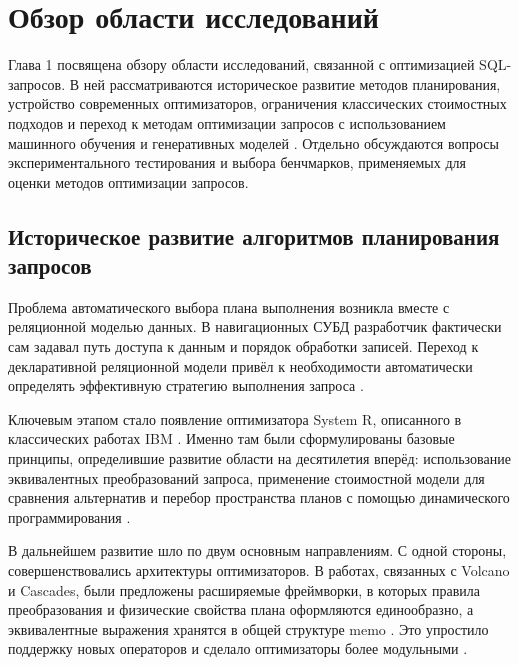 \chapter{Обзор области исследований}\label{ch:ch1}
Глава 1 посвящена обзору области исследований, связанной с оптимизацией SQL-запросов. В ней рассматриваются историческое развитие методов планирования, устройство современных оптимизаторов, ограничения классических стоимостных подходов и переход к методам оптимизации запросов с использованием машинного обучения и генеративных моделей \cite{10.1145/275487.275492, Lan_2021, ZOU2022100304, 10.1145/3626246.3654692}. Отдельно обсуждаются вопросы экспериментального тестирования и выбора бенчмарков, применяемых для оценки методов оптимизации запросов.

\section{Историческое развитие алгоритмов планирования запросов}

Проблема автоматического выбора плана выполнения возникла вместе с реляционной моделью данных. В навигационных СУБД разработчик фактически сам задавал путь доступа к данным и порядок обработки записей. Переход к декларативной реляционной модели привёл к необходимости автоматически определять эффективную стратегию выполнения запроса \cite{10.1145/362384.362685, 10.1145/356662.356666, 10.1145/800227.806919, 10.1145/960124.806919}.

Ключевым этапом стало появление оптимизатора System R, описанного в классических работах IBM \cite{10.1145/582095.582099, 10.1145/320455.320457, 10.1145/358769.358784}. Именно там были сформулированы базовые принципы, определившие развитие области на десятилетия вперёд: использование эквивалентных преобразований запроса, применение стоимостной модели для сравнения альтернатив и перебор пространства планов с помощью динамического программирования \cite{10.1145/582095.582099, 10.1145/320455.320457, 10.1145/275487.275492}.

В дальнейшем развитие шло по двум основным направлениям. С одной стороны, совершенствовались архитектуры оптимизаторов. В работах, связанных с Volcano и Cascades, были предложены расширяемые фреймворки, в которых правила преобразования и физические свойства плана оформляются единообразно, а эквивалентные выражения хранятся в общей структуре memo \cite{10.1109/69.273032, 344061, DBLP:journals/debu/Graefe95a}. Это упростило поддержку новых операторов и сделало оптимизаторы более модульными \cite{10.1145/152610.152611, 10.1145/275487.275492}.

